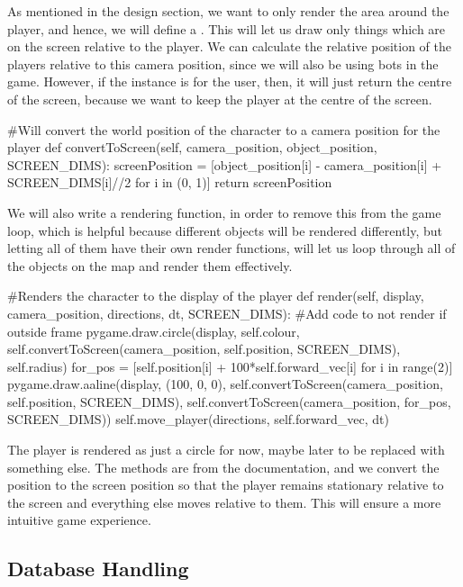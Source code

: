 \vs

As mentioned in the design section, we want to only render the area around the player, and hence, we will define a . This will let us draw only things which are on the screen relative to the player. We can calculate the relative position of the players relative to this camera position, since we will also be using bots in the game. However, if the  instance is for the user, then, it will just return the centre of the screen, because we want to keep the player at the centre of the screen.
\vs
\begin{mpy}
    #Will convert the world position of the character to a camera position for the player
    def convertToScreen(self, camera_position, object_position, SCREEN_DIMS):
        screenPosition = [object_position[i] - camera_position[i] + SCREEN_DIMS[i]//2 for i in (0, 1)]
        return screenPosition

\end{mpy}
\vs
We will also write a rendering function, in order to remove this from the game loop, which is helpful because different objects will be rendered differently, but letting all of them have their own render functions, will let us loop through all of the objects on the map and render them effectively.
\vs
\begin{mpy}
    #Renders the character to the display of the player
    def render(self, display, camera_position, directions, dt, SCREEN_DIMS):
        #Add code to not render if outside frame
        pygame.draw.circle(display, self.colour, self.convertToScreen(camera_position, self.position, SCREEN_DIMS), self.radius)
        for_pos = [self.position[i] + 100*self.forward_vec[i] for i in range(2)]
        pygame.draw.aaline(display, (100, 0, 0), self.convertToScreen(camera_position, self.position, SCREEN_DIMS), self.convertToScreen(camera_position, for_pos, SCREEN_DIMS))
        self.move_player(directions, self.forward_vec, dt)
\end{mpy}

The player is rendered as just a circle for now, maybe later to be replaced with something else. The  methods are from the documentation, and we convert the position to the screen position so that the player remains stationary relative to the screen and everything else moves relative to them. This will ensure a more intuitive game experience.

\subsection{Database Handling}

